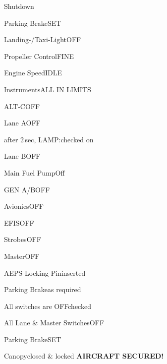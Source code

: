 \begin{checklist}{Shutdown}
  \item{Parking Brake}{SET}
  \item{Landing-/Taxi-Light}{OFF}
  \item{Propeller Control}{FINE}
  \item{Engine Speed}{IDLE}
  \item{Instruments}{ALL IN LIMITS}
  \item{ALT-C}{OFF}
  \item{Lane A}{OFF}
  \item{after 2\,sec, LAMP:}{checked on}
  \item{Lane B}{OFF}
    \hint{\textcolor{red}{Engine will STOP!}}
  \item{Main Fuel Pump}{Off}
  \item{GEN A/B}{OFF}
  \item{Avionics}{OFF}
  \item{EFIS}{OFF}
  \item{Strobes}{OFF}
  \item{Master}{OFF}
  \item{AEPS Locking Pin}{inserted}
  \item{Parking Brake}{as required}
  \item{All switches are OFF}{checked}
  
  \item{All Lane \& Master Switches}{OFF}
  \item{Parking Brake}{SET}
  \item{Canopy}{closed \& locked}
  \textbf{AIRCRAFT SECURED!}
\end{checklist}




